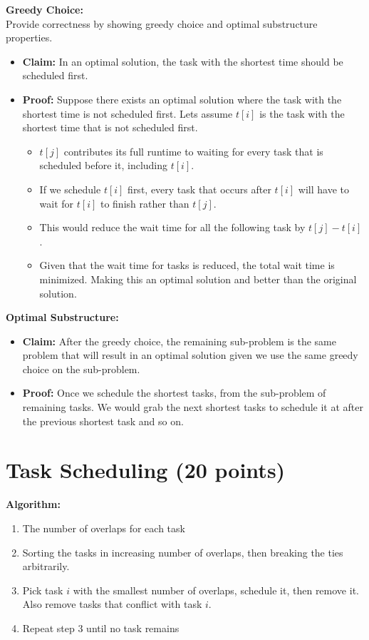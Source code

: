 \documentclass{article}[12pt]
\begin{document}
\noindent\textbf{Greedy Choice:} \\

  Provide correctness by showing greedy choice and optimal substructure properties.
    \begin{itemize}
      \item \textbf{Claim:} In an optimal solution, the task with the shortest time should be scheduled first.
      \item \textbf{Proof:} Suppose there exists an optimal solution where the task with the shortest time is not scheduled first.
        Lets assume $t[i]$ is the task with the shortest time that is not scheduled first.
        \begin{itemize}
          \item $t[j]$ contributes its full runtime to waiting for every task that is scheduled before it, including $t[i]$.
          \item If we schedule $t[i]$ first, every task that occurs after $t[i]$ 
            will have to wait for $t[i]$ to finish rather than $t[j]$.
          \item This would reduce the wait time for all the following task by $t[j] - t[i]$.
          \item Given that the wait time for tasks is reduced, the total wait time is minimized. Making this an optimal solution and better
            than the original solution.
        \end{itemize}
    \end{itemize}

\noindent\textbf{Optimal Substructure:} \\
\begin{itemize}
  \item \textbf{Claim:} After the greedy choice, the remaining sub-problem is the 
    same problem that will result in an optimal solution given we use the same greedy choice on the sub-problem.
  \item \textbf{Proof:} Once we schedule the shortest tasks, from the sub-problem of remaining tasks.
    We would grab the next shortest tasks to schedule it at after the previous shortest task and so on.
\end{itemize}

\newpage
\section{Task Scheduling (20 points)}
\textbf{Algorithm:} \\
\begin{enumerate}
  \item The number of overlaps for each task
  \item Sorting the tasks in increasing number of overlaps, then breaking the ties arbitrarily.
  \item Pick task $i$ with the smallest number of overlaps, schedule it, then remove it. Also remove tasks that conflict with task $i$.
  \item Repeat step 3 until no task remains
\end{enumerate}
\end{document}
